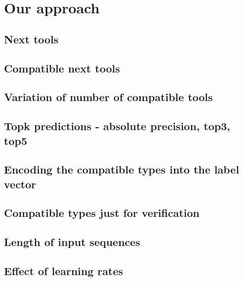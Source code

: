 \chapter{Our approach}\label{chap:approach_wf}

\section{Next tools}

\section{Compatible next tools}

\section{Variation of number of compatible tools}

\section{Topk predictions - absolute precision, top3, top5}

\section{Encoding the compatible types into the label vector}

\section{Compatible types just for verification}

\section{Length of input sequences}

\section{Effect of learning rates}
